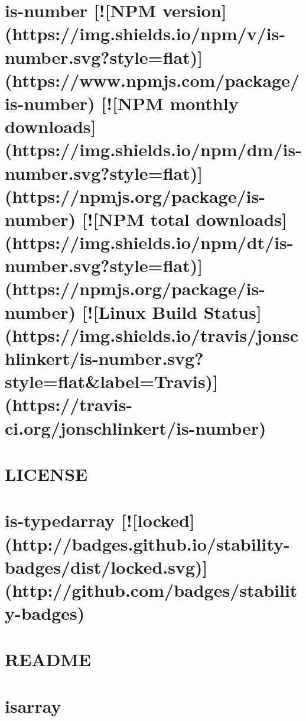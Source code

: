 \documentclass[twoside]{book}
\newcommand{\+}{\discretionary{\mbox{\scriptsize$\hookleftarrow$}}{}{}}
\begin{document}
\chapter{is-\/number \mbox{[}!\mbox{[}N\+PM version\mbox{]}(https\+://img.shields.\+io/npm/v/is-\/number.svg?style=flat)\mbox{]}(https\+://www.npmjs.\+com/package/is-\/number) \mbox{[}!\mbox{[}N\+PM monthly downloads\mbox{]}(https\+://img.shields.\+io/npm/dm/is-\/number.svg?style=flat)\mbox{]}(https\+://npmjs.org/package/is-\/number) \mbox{[}!\mbox{[}N\+PM total downloads\mbox{]}(https\+://img.shields.\+io/npm/dt/is-\/number.svg?style=flat)\mbox{]}(https\+://npmjs.org/package/is-\/number) \mbox{[}!\mbox{[}Linux Build Status\mbox{]}(https\+://img.shields.\+io/travis/jonschlinkert/is-\/number.svg?style=flat\&label=Travis)\mbox{]}(https\+://travis-\/ci.org/jonschlinkert/is-\/number)}
\label{md_dsmacc_examples_DRmerge_node_modules_is-number_README}

\chapter{L\+I\+C\+E\+N\+SE}
\label{md_dsmacc_examples_DRmerge_node_modules_is-typedarray_LICENSE}

\chapter{is-\/typedarray \mbox{[}!\mbox{[}locked\mbox{]}(http\+://badges.github.\+io/stability-\/badges/dist/locked.svg)\mbox{]}(http\+://github.com/badges/stability-\/badges)}
\label{md_dsmacc_examples_DRmerge_node_modules_is-typedarray_README}

\chapter{R\+E\+A\+D\+ME}
\label{md_dsmacc_examples_DRmerge_node_modules_is-utf8_README}

\chapter{isarray}
\label{md_dsmacc_examples_DRmerge_node_modules_isarray_README}

\end{document}
